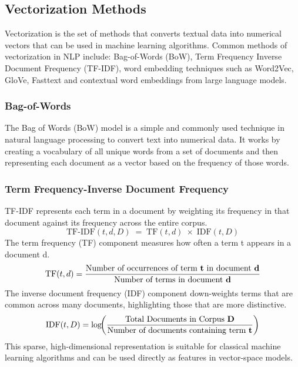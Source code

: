 \subsection{Vectorization Methods}
Vectorization is the set of methods that converts textual data into numerical vectors that can be used in machine learning algorithms. Common methods of vectorization in NLP include: Bag-of-Words (BoW), Term Frequency Inverse Document Frequency (TF-IDF), word embedding techniques such as Word2Vec, GloVe, Fasttext and contextual word embeddings from large language models.
\subsubsection{Bag-of-Words}
The Bag of Words (BoW) model is a simple and commonly used technique in natural language processing to convert text into numerical data. It works by creating a vocabulary of all unique words from a set of documents and then representing each document as a vector based on the frequency of those words. 

\subsubsection{Term Frequency-Inverse Document Frequency}
TF-IDF represents each term in a document by weighting its frequency in that document against its frequency across the entire corpus.
\begin{equation}
\mathrm{TF\text{-}IDF}(t,d,D) \;=\; \mathrm{TF}(t,d)\;\times\;\mathrm{IDF}(t,D)
\end{equation}
The term frequency (TF) component measures how often a term t appears in a document d.
\begin{equation}
\text{TF}(t,d) = \frac{\text{Number of occurrences of term \textbf{t} in document \textbf{d}}}{\text{Number of terms in document \textbf{d}}}
\end{equation}
The inverse document frequency (IDF) component down-weights terms that are common across many documents, highlighting those that are more distinctive. 
\begin{equation}
\text{IDF}(t,D) = \log\!\biggl(\frac{\text{Total Documents in Corpus \textbf{D}}}{\text{Number of documents containing term \textbf{t}}}\biggr)
\end{equation}
This sparse, high-dimensional representation is suitable for classical machine learning algorithms and can be used directly as features in vector-space models.
